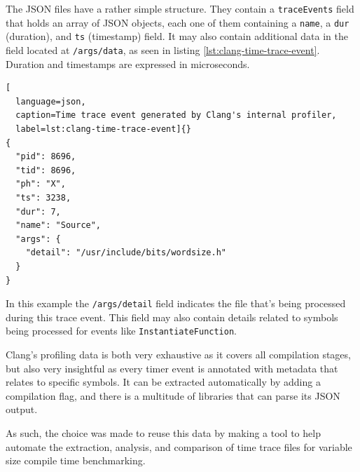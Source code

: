 \documentclass[../main]{subfiles}
\begin{document}
The JSON files have a rather simple structure. They contain a
\lstinline{traceEvents} field that holds an array of JSON objects, each one of
them containing a \lstinline{name}, a \lstinline{dur} (duration), and
\lstinline{ts} (timestamp) field. It may also contain additional data in the
field located at \lstinline{/args/data}, as seen in listing
\ref{lst:clang-time-trace-event}. Duration and timestamps are expressed in
microseconds.

\begin{lstlisting}[
  language=json,
  caption=Time trace event generated by Clang's internal profiler,
  label=lst:clang-time-trace-event]{}
{
  "pid": 8696,
  "tid": 8696,
  "ph": "X",
  "ts": 3238,
  "dur": 7,
  "name": "Source",
  "args": {
    "detail": "/usr/include/bits/wordsize.h"
  }
}
\end{lstlisting}

In this example the \lstinline{/args/detail} field indicates the file that's
being processed during this trace event. This field may also contain details
related to symbols being processed for events like
\lstinline{InstantiateFunction}.

Clang's profiling data is both very exhaustive as it covers
all compilation stages, but also very insightful as every timer event is
annotated with metadata that relates to specific \cpp symbols.
It can be extracted automatically by adding a compilation flag,
and there is a multitude of libraries that can parse its JSON output.

As such, the choice was made to reuse this data by making a tool to help
automate the extraction, analysis, and comparison of time trace files
for variable size compile time benchmarking.
\end{document}
